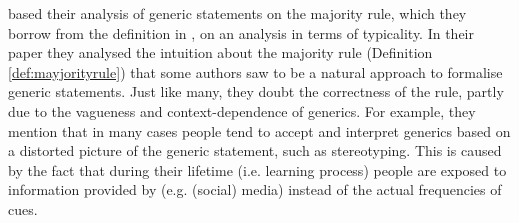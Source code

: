 \documentclass[twoside]{uva-inf-bachelor-thesis}
\theoremstyle{definition}
\begin{document}
\cite{van2020generics} based their analysis of generic statements on the majority rule, which they borrow from the definition in \cite{cohen1996think}, on an analysis in terms of typicality. In their paper they analysed the intuition about the majority rule (Definition \ref{def:mayjorityrule}) that some authors saw to be a natural approach to formalise generic statements. Just like many, they doubt the correctness of the rule, partly due to the vagueness and context-dependence of generics. For example, they mention that in many cases people tend to accept and interpret generics based on a distorted picture of the generic statement, such as stereotyping. This is caused by the fact that during their lifetime (i.e. learning process) people are exposed to information provided by (e.g. (social) media) instead of the actual frequencies of cues.
\end{document}
